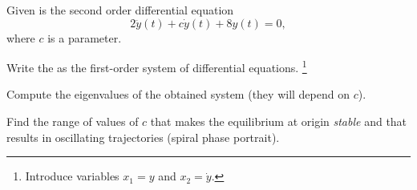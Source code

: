       \begin{question}
        Given is the second order differential equation \[2 \ddot y (t) + c \dot y(t) + 8 y(t) = 0,\] where \(c\) is a parameter.
        \begin{compactenum}[(a)]
        \item Write the \ode{} as the first-order system of differential
          equations. \footnote{Introduce variables \(x_{1} = y\) and \(x_{2} =
            \dot{y}\).}
        \item Compute the eigenvalues of the obtained system (they will depend on \(c\)).
        \item Find the range of values of \(c\) that makes the equilibrium at origin \emph{stable} and that results in oscillating trajectories (spiral phase portrait).
      \end{compactenum}
      \end{question}

